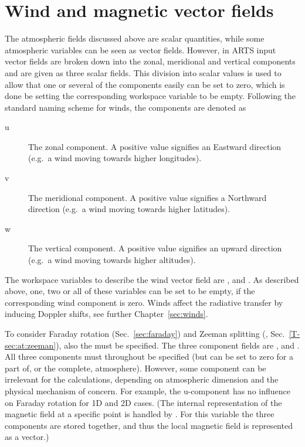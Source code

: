 \section{Wind and magnetic vector fields}
\label{sec:atm:vecfields}
%
The atmospheric fields discussed above are scalar quantities, while some
atmospheric variables can be seen as vector fields. However, in ARTS input
vector fields are broken down into the zonal, meridional and vertical
components and are given as three scalar fields. This division into scalar values
is used to allow that one or several of the components easily can be set to
zero, which is done be setting the corresponding workspace variable to be
empty. Following the standard naming scheme for winds, the components are
denoted as
\begin{description}
\item[u] The zonal component. A positive value signifies an Eastward direction
  (e.g.\ a wind moving towards higher longitudes).
\item[v] The meridional component. A positive value signifies a Northward
  direction (e.g.\ a wind moving towards higher latitudes).
\item[w] The vertical component. A positive value signifies an upward direction
  (e.g.\ a wind moving towards higher altitudes).
\end{description}
The workspace variables to describe the wind vector field are
,  and
. As described above, one, two or all of these
variables can be set to be empty, if the corresponding wind component is zero.
Winds affect the radiative transfer by inducing Doppler shifts, see further
Chapter~\ref{sec:winds}. 


To consider Faraday rotation (Sec.~\ref{sec:faraday}) and Zeeman splitting
(\theory, Sec.~\ref{T-sec:at:zeeman}), also the  must
be specified. The three component fields are ,
 and . All three components
must throughout be specified (but can be set to zero for a part of, or the
complete, atmosphere). However, some component can be irrelevant for the
calculations, depending on atmospheric dimension and the physical mechanism of
concern. For example, the u-component has no influence on Faraday rotation for
1D and 2D cases. (The internal representation of the magnetic field at a
specific point is handled by . For this variable the three
components are stored together, and thus the local magnetic field is
represented as a vector.)



